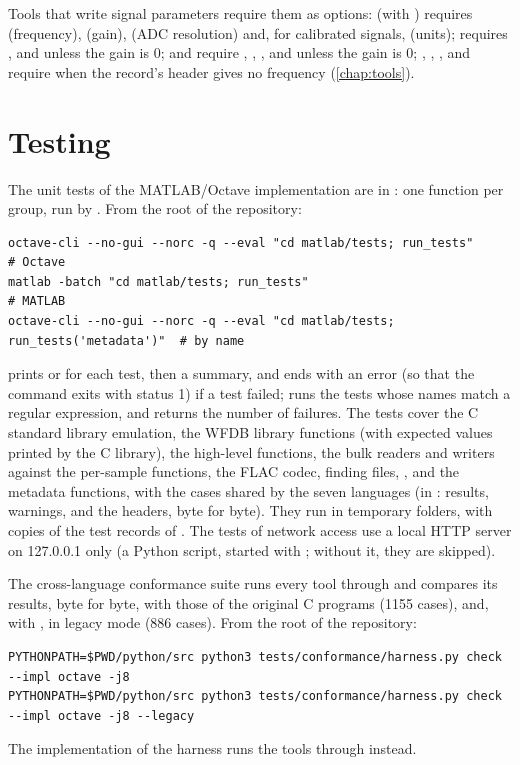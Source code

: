 Tools that write signal parameters require them as options:  (with
) requires  (frequency),  (gain),  (ADC resolution) and,
for calibrated signals,  (units);  requires , and 
unless the gain is 0;  and  require , ,
, and  unless the gain is 0; , , ,
 and  require  when the record's header gives no
frequency (\cref{chap:tools}).

\section{Testing}
\label{sec:matlab-testing}

The unit tests of the MATLAB/Octave implementation are in : one
function  per group, run by . From the root of the
repository:

\begin{lstlisting}[style=shell]
octave-cli --no-gui --norc -q --eval "cd matlab/tests; run_tests"           # Octave
matlab -batch "cd matlab/tests; run_tests"                                  # MATLAB
octave-cli --no-gui --norc -q --eval "cd matlab/tests; run_tests('metadata')"  # by name
\end{lstlisting}

 prints  or  for each test, then
a summary, and ends with an error (so that the command exits with status 1) if a test
failed;  runs the tests whose names match a regular expression,
and  returns the number of failures. The tests cover the C
standard library emulation, the WFDB library functions (with expected values printed by
the C library), the high-level functions, the bulk readers and writers against the
per-sample functions, the FLAC codec, finding files, , and the
metadata functions, with the cases shared by the seven languages (in
: results, warnings, and the headers, byte for byte). They run in
temporary folders, with copies of the test records of . The tests of
network access use a local HTTP server on 127.0.0.1 only (a Python script, started with
; without it, they are skipped).

The cross-language conformance suite runs every tool through 
and compares its results, byte for byte, with those of the original C programs (1155
cases), and, with , in legacy mode (886 cases). From the root of the
repository:

\begin{lstlisting}[style=shell]
PYTHONPATH=$PWD/python/src python3 tests/conformance/harness.py check --impl octave -j8
PYTHONPATH=$PWD/python/src python3 tests/conformance/harness.py check --impl octave -j8 --legacy
\end{lstlisting}

The implementation  of the harness runs the tools through
 instead.
